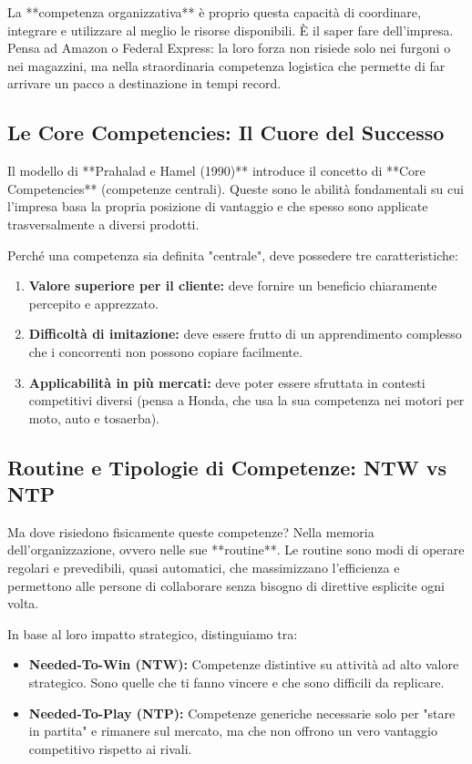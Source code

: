 \documentclass[a4paper,10pt]{article}
\begin{document}
La **competenza organizzativa** è proprio questa capacità di coordinare, integrare e utilizzare al meglio le risorse disponibili. È il saper fare dell'impresa. Pensa ad Amazon o Federal Express: la loro forza non risiede solo nei furgoni o nei magazzini, ma nella straordinaria competenza logistica che permette di far arrivare un pacco a destinazione in tempi record.

\subsection*{Le Core Competencies: Il Cuore del Successo}

Il modello di **Prahalad e Hamel (1990)** introduce il concetto di **Core Competencies** (competenze centrali). Queste sono le abilità fondamentali su cui l'impresa basa la propria posizione di vantaggio e che spesso sono applicate trasversalmente a diversi prodotti. 

Perché una competenza sia definita "centrale", deve possedere tre caratteristiche:
\begin{enumerate}
    \item \textbf{Valore superiore per il cliente:} deve fornire un beneficio chiaramente percepito e apprezzato.
    \item \textbf{Difficoltà di imitazione:} deve essere frutto di un apprendimento complesso che i concorrenti non possono copiare facilmente.
    \item \textbf{Applicabilità in più mercati:} deve poter essere sfruttata in contesti competitivi diversi (pensa a Honda, che usa la sua competenza nei motori per moto, auto e tosaerba).
\end{enumerate}

\subsection*{Routine e Tipologie di Competenze: NTW vs NTP}

Ma dove risiedono fisicamente queste competenze? Nella memoria dell'organizzazione, ovvero nelle sue **routine**. Le routine sono modi di operare regolari e prevedibili, quasi automatici, che massimizzano l'efficienza e permettono alle persone di collaborare senza bisogno di direttive esplicite ogni volta.

In base al loro impatto strategico, distinguiamo tra:
\begin{itemize}
    \item \textbf{Needed-To-Win (NTW):} Competenze distintive su attività ad alto valore strategico. Sono quelle che ti fanno vincere e che sono difficili da replicare.
    \item \textbf{Needed-To-Play (NTP):} Competenze generiche necessarie solo per "stare in partita" e rimanere sul mercato, ma che non offrono un vero vantaggio competitivo rispetto ai rivali.
\end{itemize}
\end{document}
